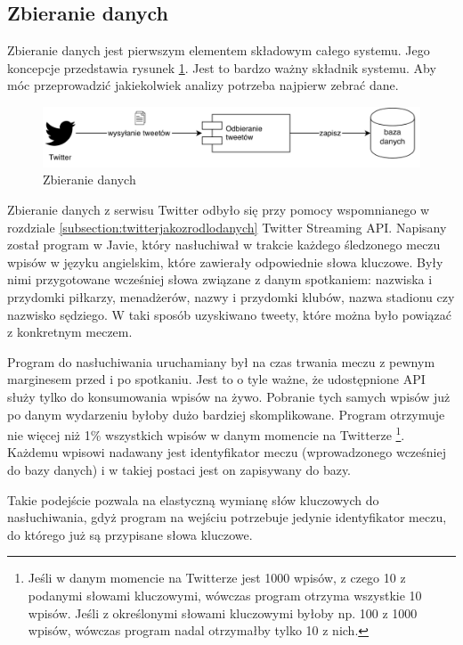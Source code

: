 \clearpage
\subsection{Zbieranie danych}
\label{subsection:zbieraniedanych}
Zbieranie danych jest pierwszym elementem składowym całego systemu.
Jego koncepcje przedstawia rysunek \ref{image:zbieranie-danych}.
Jest to bardzo ważny składnik systemu. Aby móc przeprowadzić jakiekolwiek
analizy potrzeba najpierw zebrać dane.

\begin{figure}[ht!]
\centering
\includegraphics[width=160mm]{img/zbieranie-danych.png}
\caption{Zbieranie danych}
\label{image:zbieranie-danych}
\end{figure}


Zbieranie danych z serwisu Twitter odbyło się przy pomocy wspomnianego w
rozdziale \ref{subsection:twitterjakozrodlodanych} Twitter Streaming API.
Napisany został program w Javie, który nasłuchiwał w trakcie każdego śledzonego
meczu wpisów w języku angielskim, które zawierały odpowiednie słowa kluczowe.
Były nimi przygotowane wcześniej słowa związane z danym spotkaniem: nazwiska i
przydomki piłkarzy, menadżerów, nazwy i przydomki klubów, nazwa stadionu czy
nazwisko sędziego. W taki sposób uzyskiwano tweety, które można było powiązać z
konkretnym meczem.

Program do nasłuchiwania uruchamiany był na czas trwania meczu z pewnym
marginesem przed i po spotkaniu. Jest to o tyle ważne, że udostępnione API służy
tylko do konsumowania wpisów na żywo. Pobranie tych samych wpisów już po danym
wydarzeniu byłoby dużo bardziej skomplikowane. Program otrzymuje nie więcej niż
1\% wszystkich wpisów w danym momencie na Twitterze \footnote{Jeśli w danym
momencie na Twitterze jest 1000 wpisów, z czego 10 z podanymi słowami
kluczowymi, wówczas program otrzyma wszystkie 10 wpisów. Jeśli z określonymi
słowami kluczowymi byłoby np. 100 z 1000 wpisów, wówczas program nadal
otrzymałby tylko 10 z nich.}. Każdemu wpisowi nadawany jest identyfikator meczu (wprowadzonego
wcześniej do bazy danych) i w takiej postaci jest on zapisywany do bazy.

Takie podejście pozwala na elastyczną wymianę słów kluczowych do nasłuchiwania,
gdyż program na wejściu potrzebuje jedynie identyfikator meczu, do którego już
są przypisane słowa kluczowe.


